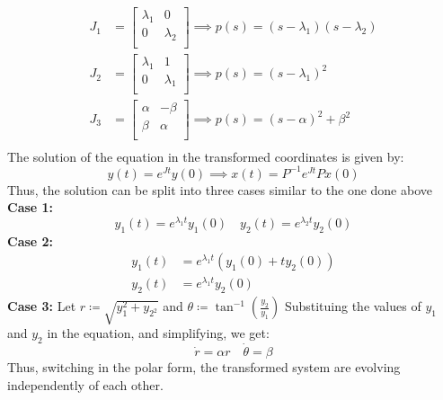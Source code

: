 \[
    \begin{aligned}
        J_1 &= \begin{bmatrix}
            \lambda_1  &  0 \\
            0 &  \lambda _2 \\
        \end{bmatrix} \implies  p(s) = (s-\lambda _1) (s-\lambda _2)\\
        J_2 &= \begin{bmatrix}
            \lambda_1  &  1 \\
            0 &  \lambda _1 \\
        \end{bmatrix} \implies  p(s) = (s-\lambda _1) ^2\\
        J_3 &= \begin{bmatrix}
            \alpha  &  -\beta  \\
            \beta  &  \alpha  \\
        \end{bmatrix} \implies  p(s) = (s-\alpha) ^2 + \beta ^2\\
    \end{aligned}
\]
The solution of the equation in the transformed coordinates is given by:
\[
    y(t) = e^{Jt} y(0) \implies  x(t) = P ^{-1} e^{Jt} P x(0)
\]
Thus, the solution can be split into three cases similar to the one done above\\
\textbf{Case 1:}
\[
    y_1(t) = e^{\lambda _1 t} y_1(0) \quad y_2(t) = e^{\lambda _2 t} y_2(0)
\]
\textbf{Case 2:}
\[
    \begin{aligned}
        y_1(t) &= e^{\lambda _1 t} \left(   y_1(0) + t y_2(0)  \right)\\
        y_2(t) &= e^{\lambda _1 t} y_2(0)
    \end{aligned}
\]
\textbf{Case 3:} Let \( r\coloneqq \sqrt{y_1 ^{2} + y_{2^{2} }  } \) and \(\theta \coloneqq \tan ^{-1}  \left( \frac{y_2}{y_1}  \right) \)
Substituing the values of \(y_1\) and \(y_2\) in the equation, and simplifying, we get:
\[
    \dot{r} = \alpha r \quad \dot{\theta} = \beta 
\]
Thus, switching in the polar form, the transformed system are evolving independently of each other.